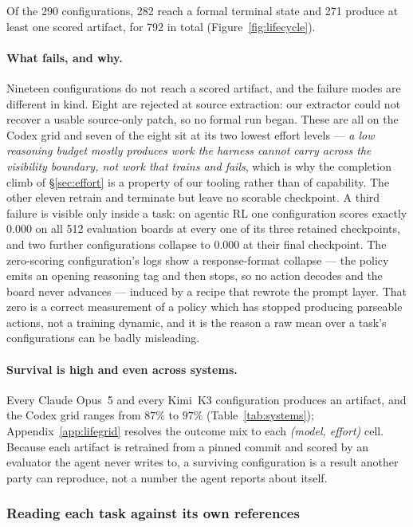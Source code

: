 Of the 290 configurations, 282 reach a formal terminal state and 271 produce at least one scored
artifact, for 792 in total (Figure~\ref{fig:lifecycle}).

\paragraph{What fails, and why.}
\label{sec:failures}
Nineteen configurations do not reach a scored artifact, and the failure modes are different in kind.
Eight are rejected at source extraction: our extractor could not recover a usable source-only patch,
so no formal run began. These are all on the Codex grid and seven of the eight sit at its two lowest
effort levels --- \emph{a low reasoning budget mostly produces work the harness cannot carry across
the visibility boundary, not work that trains and fails}, which is why the completion climb of
\S\ref{sec:effort} is a property of our tooling rather than of capability. The other eleven retrain
and terminate but leave no scorable checkpoint. A third failure is visible only inside a task: on
agentic RL one configuration scores exactly $0.000$ on all 512 evaluation boards at every one of its
three retained checkpoints, and two further configurations collapse to $0.000$ at their final
checkpoint. The zero-scoring configuration's logs show a response-format collapse --- the policy
emits an opening reasoning tag and then stops, so no action decodes and the board never advances ---
induced by a recipe that rewrote the prompt layer. That zero is a correct measurement of a policy
which has stopped producing parseable actions, not a training dynamic, and it is the reason a raw
mean over a task's configurations can be badly misleading.

\paragraph{Survival is high and even across systems.} Every Claude Opus~5 and every Kimi~K3 configuration produces an
artifact, and the Codex grid ranges from $87\%$ to $97\%$ (Table~\ref{tab:systems});
Appendix~\ref{app:lifegrid} resolves the outcome mix to each \emph{(model, effort)} cell. Because each
artifact is retrained from a pinned commit and scored by an evaluator the agent never writes to, a
surviving configuration is a result another party can reproduce, not a number the agent reports about
itself.



\subsubsection{Reading each task against its own references}
\label{sec:pertask}


